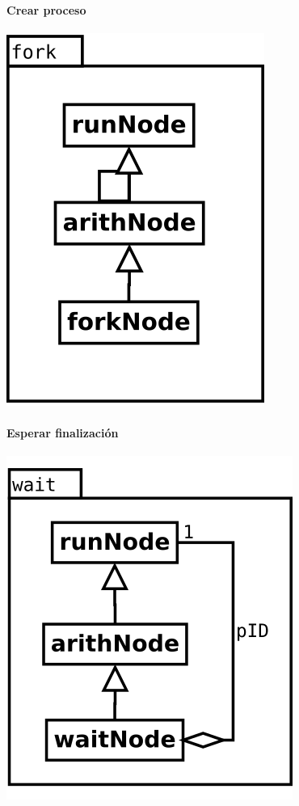\begin{multicols}{2}
   \paragraph {Crear proceso} 
   \begin{center}
   \includegraphics[scale=0.4]{fork.png} \\
   \end{center}
\columnbreak
   \paragraph {Esperar finalización} 
   \begin{center}
   \includegraphics[scale=0.4]{wait.png} \\
   \end{center}
\end{multicols}


